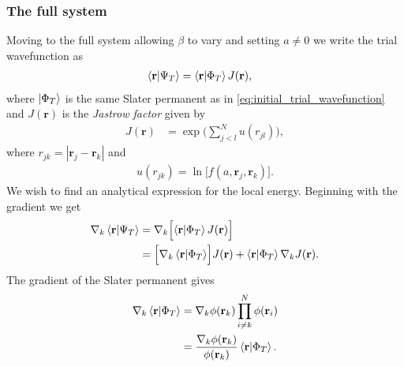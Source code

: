\documentclass[
    a4paper, aps, twocolumn, floatfix, superscriptaddress]{revtex4-1}
\newcommand{\vf}{\mathbf}
\newcommand{\1}{\mathds{1}}
\begin{document}
        \subsubsection{The full system}
            Moving to the full system allowing $\beta$ to vary and setting $a
            \neq 0$ we write the trial wavefunction as
            \begin{align}
                \bra{\vf{r}}\ket{\Psi_T}
                &=
                \bra{\vf{r}}\ket{\Phi_T}
                J(\vf{r}),
            \end{align}
            where $\ket{\Phi_T}$ is the same Slater permanent as in
            \autoref{eq:initial_trial_wavefunction} and $J(\vf{r})$ is the
            \textit{Jastrow factor} given by
            \begin{align}
                J(\vf{r})
                &=
                \exp\Biggl(
                    \sum_{j < l}^N u(r_{jl})
                \Biggr),
            \end{align}
            where $r_{jk} = |\vf{r}_j - \vf{r}_k|$ and
            \begin{align}
                u(r_{jk}) = \ln\bigl[f(a, \vf{r}_j, \vf{r}_k)\bigr].
            \end{align}
            We wish to find an analytical expression for the local energy.
            Beginning with the gradient we get
            \begin{align}
                \nabla_k\bra{\vf{r}}\ket{\Psi_T}
                &= \nabla_k\Bigl[
                    \bra{\vf{r}}\ket{\Phi_T}
                    J(\vf{r})
                \Bigr] \\
                &=
                \Bigl[
                    \nabla_k
                    \bra{\vf{r}}\ket{\Phi_T}
                \Bigr]
                J(\vf{r})
                + \bra{\vf{r}}\ket{\Phi_T}
                \nabla_k J(\vf{r}).
            \end{align}
            The gradient of the Slater permanent gives
            \begin{align}
                \nabla_k
                \bra{\vf{r}}\ket{\Phi_T}
                &=
                \nabla_k\phi(\vf{r}_k)
                \prod_{i \neq k}^N\phi(\vf{r}_i) \\
                &= \frac{\nabla_k\phi(\vf{r}_k)}{\phi(\vf{r}_k)}
                \bra{\vf{r}}\ket{\Phi_T}.
            \end{align}
\end{document}
